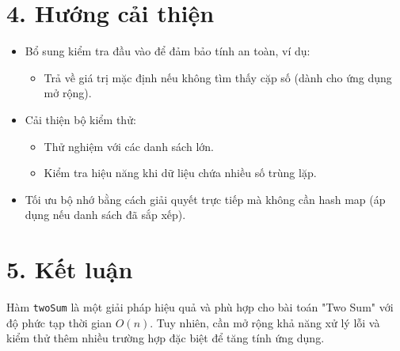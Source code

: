 \documentclass[a4paper,12pt]{article}
\begin{document}
\section*{4. Hướng cải thiện}
\begin{itemize}
    \item Bổ sung kiểm tra đầu vào để đảm bảo tính an toàn, ví dụ:
    \begin{itemize}
        \item Trả về giá trị mặc định nếu không tìm thấy cặp số (dành cho ứng dụng mở rộng).
    \end{itemize}
    \item Cải thiện bộ kiểm thử:
    \begin{itemize}
        \item Thử nghiệm với các danh sách lớn.
        \item Kiểm tra hiệu năng khi dữ liệu chứa nhiều số trùng lặp.
    \end{itemize}
    \item Tối ưu bộ nhớ bằng cách giải quyết trực tiếp mà không cần hash map (áp dụng nếu danh sách đã sắp xếp).
\end{itemize}

\section*{5. Kết luận}

Hàm \texttt{twoSum} là một giải pháp hiệu quả và phù hợp cho bài toán "Two Sum" với độ phức tạp thời gian \(O(n)\). Tuy nhiên, cần mở rộng khả năng xử lý lỗi và kiểm thử thêm nhiều trường hợp đặc biệt để tăng tính ứng dụng.
\end{document}
